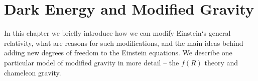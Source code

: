 \chapter{Dark Energy and Modified Gravity}
\label{chpt:de_mg}
In this chapter we briefly introduce how we can modify Einstein`s general relativity, what are reasons for such modifications, and the main ideas behind adding new degrees of freedom to the Einstein equations. We describe one particular model of modified gravity in more detail -- the $f(R)$ theory and chameleon gravity.







